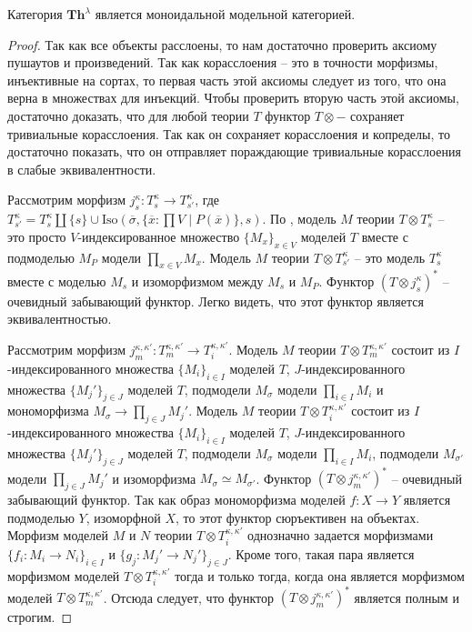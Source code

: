 \documentclass[reqno]{amsart}
\theoremstyle{definition}
\theoremstyle{remark}
\newcommand{\bcat}[1]{\mathbf{#1}}
\newcommand{\fs}[1]{\mathrm{#1}}
\newcommand{\Th}{\bcat{Th}}
\begin{document}
\begin{prop}
Категория $\Th^\lambda$ является моноидальной модельной категорией.
\end{prop}
\begin{proof}
Так как все объекты расслоены, то нам достаточно проверить аксиому пушаутов и произведений.
Так как корасслоения -- это в точности морфизмы, инъективные на сортах, то первая часть этой аксиомы следует из того, что она верна в множествах для инъекций.
Чтобы проверить вторую часть этой аксиомы, достаточно доказать, что для любой теории $T$ функтор $T \otimes -$ сохраняет тривиальные корасслоения.
Так как он сохраняет корасслоения и копределы, то достаточно показать, что он отправляет пораждающие тривиальные корасслоения в слабые эквивалентности.

Рассмотрим морфизм $j^\kappa_s : T^\kappa_s \to T^\kappa_{s'}$, где $T^\kappa_{s'} = T^\kappa_s \amalg \{ s \} \cup \fs{Iso}(\overline{\sigma}, \{ \overline{x} : \prod V \mid P(\overline{x}) \}, s)$.
По , модель $M$ теории $T \otimes T^\kappa_s$ -- это просто $V$-индексированное множество $\{ M_x \}_{x \in V}$ моделей $T$ вместе с подмоделью $M_P$ модели $\prod_{x \in V} M_x$.
Модель $M$ теории $T \otimes T^\kappa_{s'}$ -- это модель $T^\kappa_s$ вместе с моделью $M_s$ и изоморфизмом между $M_s$ и $M_P$.
Функтор $(T \otimes j^\kappa_s)^*$ -- очевидный забывающий функтор.
Легко видеть, что этот функтор является эквивалентностью.

Рассмотрим морфизм $j^{\kappa,\kappa'}_m : T^{\kappa,\kappa'}_m \to T^{\kappa,\kappa'}_i$.
Модель $M$ теории $T \otimes T^{\kappa,\kappa'}_m$ состоит из $I$-индексированного множества $\{ M_i \}_{i \in I}$ моделей $T$,
$J$-индексированного множества $\{ M_j' \}_{j \in J}$ моделей $T$, подмодели $M_\sigma$ модели $\prod_{i \in I} M_i$ и мономорфизма $M_\sigma \to \prod_{j \in J} M_j'$.
Модель $M$ теории $T \otimes T^{\kappa,\kappa'}_i$ состоит из $I$-индексированного множества $\{ M_i \}_{i \in I}$ моделей $T$,
$J$-индексированного множества $\{ M_j' \}_{j \in J}$ моделей $T$, подмодели $M_\sigma$ модели $\prod_{i \in I} M_i$, подмодели $M_{\sigma'}$ модели $\prod_{j \in J} M_j'$ и изоморфизма $M_\sigma \simeq M_{\sigma'}$.
Функтор $(T \otimes j^{\kappa,\kappa'}_m)^*$ -- очевидный забывающий функтор.
Так как образ мономорфизма моделей $f : X \to Y$ является подмоделью $Y$, изоморфной $X$, то этот функтор сюръективен на объектах.
Морфизм моделей $M$ и $N$ теории $T \otimes T^{\kappa,\kappa'}_i$ однозначно задается морфизмами $\{ f_i : M_i \to N_i \}_{i \in I}$ и $\{ g_j : M_j' \to N_j' \}_{j \in J}$.
Кроме того, такая пара является морфизмом моделей $T \otimes T^{\kappa,\kappa'}_i$ тогда и только тогда, когда она является морфизмом моделей $T \otimes T^{\kappa,\kappa'}_m$.
Отсюда следует, что функтор $(T \otimes j^{\kappa,\kappa'}_m)^*$ является полным и строгим.
\end{proof}
\end{document}
